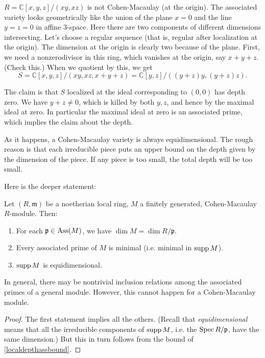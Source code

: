 \begin{example}
$R=\mathbb{C}[x,y,z]/(xy, xz)$ is not Cohen-Macaulay (at the
origin). The associated variety looks
geometrically like the union of the plane $x=0$ and the line
$y=z=0$ in affine
3-space. Here there are two components of different dimensions
intersecting.
Let's choose a regular sequence (that is, regular after
localization at the
origin). The dimension at the origin is clearly two because of
the plane.
First, we need a nonzerodivisor in this ring, which vanishes at
the origin, say
$ x+y+z$. (Check this.) When we quotient by
this, we get
\[ S=\mathbb{C}[x,y,z]/(xy,xz, x+y+z) = \mathbb{C}[y,z]/(
(y+z)y, (y+z)z). \]

The claim is that $S$ localized at the ideal corresponding to
$(0,0)$ has depth
zero. We have $y+z \neq 0$, which is killed by both $y,z$, and
hence by the
maximal ideal at zero. In particular the maximal ideal at zero
is an associated
prime, which implies the claim about the depth.
\end{example}

As it happens, a Cohen-Macaulay variety is always
equidimensional. The rough
reason is that each irreducible piece puts an upper bound on the
depth given by
the dimension of the piece. If any piece is too small, the total
depth will be
too small.


Here is the deeper statement:

\begin{proposition} \label{dimthing}
Let $(R, \mathfrak{m})$ be a noetherian local ring, $M$ a finitely generated,
Cohen-Macaulay $R$-module.
Then:
\begin{enumerate}
\item For each $\mathfrak{p}  \in \operatorname{Ass}(M)$, we have $\dim M = \dim
R/\mathfrak{p}$.
\item Every associated prime of $M$ is minimal (i.e. minimal in $\operatorname{supp} M$).
\item  $\operatorname{supp} M$ is equidimensional.
\end{enumerate}
\end{proposition} 
In general, there may be nontrivial inclusion relations among the
associated primes of a general module. However, this cannot happen for a Cohen-Macaulay
module.
\begin{proof} 
The first statement implies all the others. (Recall that
\emph{equidimensional} means that all the irreducible components of $\operatorname{supp}
M$, i.e. the $\operatorname{Spec} R/\mathfrak{p}$, have the same dimension.) 
But this in turn follows from the bound of  \cref{localdepthassbound}.
\end{proof} 

